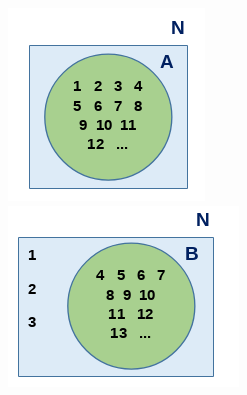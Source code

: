 \documentclass[12pt]{article}
\begin{document}
\begin{enumerate}
\begin{figure}[h!]
                        \centering
                        \begin{minipage}[b]{0.2\textwidth}
                            \centering
                            \includegraphics[width=\textwidth]{Img/Tarea2/Tarea2_ej1_a.png}
                        \end{minipage}
                        \hfill
                        \begin{minipage}[b]{0.23\textwidth}
                            \centering
                            \includegraphics[width=\textwidth]{Img/Tarea2/Tarea2_ej1_b.png}

\end{minipage}
\end{figure}
\end{enumerate}
\end{document}
